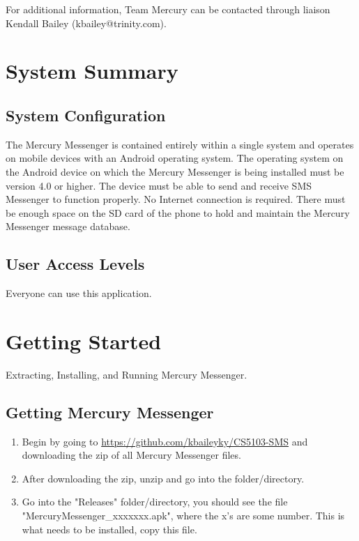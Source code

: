 \documentclass{article}
\begin{document}
For additional information, Team Mercury can be contacted through liaison Kendall Bailey (kbailey@trinity.com).

\section{System Summary}
\label{sec:SysSummary}

\subsection{System Configuration}
The Mercury Messenger is contained entirely within a single system and operates on mobile devices with an Android operating system. The operating system on the Android device on which the Mercury Messenger is being installed must be version 4.0 or higher. The device must be able to send and receive SMS Messenger to function properly. No Internet connection is required. There must be enough space on the SD card of the phone to hold and maintain the Mercury Messenger message database.

\subsection{User Access Levels}
Everyone can use this application.

\section{Getting Started}
Extracting, Installing, and Running Mercury Messenger.

\subsection{Getting Mercury Messenger}
\begin{enumerate}
\item Begin by going to \url{https://github.com/kbaileyky/CS5103-SMS} and downloading the zip of all Mercury Messenger files.
\item After downloading the zip, unzip and go into the folder/directory.
\item Go into the "Releases" folder/directory, you should see the file "MercuryMessenger\_xxxxxxx.apk", where the x's are some number. This is what needs to be installed, copy this file.


\end{enumerate}
\end{document}
